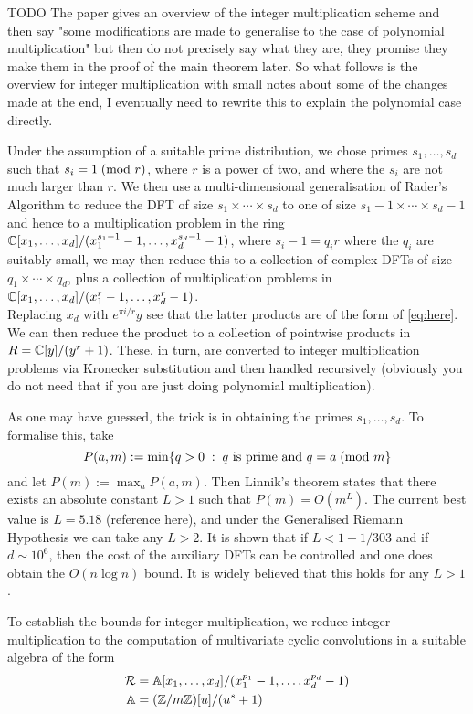 TODO The paper gives an overview of the integer multiplication scheme and then say "some modifications are made to generalise to the case of polynomial multiplication" but then do not precisely say what they are, they promise they make them in the proof of the main theorem later. So what follows is the overview for integer multiplication with small notes about some of the changes made at the end, I eventually need to rewrite this to explain the polynomial case directly.
\medskip

Under the assumption of a suitable prime distribution, we chose primes $s_1, \ldots, s_d$ such that $s_i = 1 \;(\textrm{mod } r)$, where $r$ is a power of two, and where the $s_i$ are not much larger than $r$. We then use a multi-dimensional generalisation of Rader's Algorithm to reduce the DFT of size $s_1 \times \cdots \times s_d$ to one of size $s_1-1 \times \cdots \times s_d-1$ and hence to a multiplication problem in the ring ${\mathbb C}[x_1, \ldots, x_d] / (x_1^{s_1 - 1} - 1, \ldots, x_d^{s_d - 1} - 1)$, where $s_i - 1 = q_i r$ where the $q_i$ are suitably small, we may then reduce this to a collection of complex DFTs of size $q_1 \times \cdots \times q_d$, plus a collection of multiplication problems in ${\mathbb C}[x_1, \ldots, x_d] / (x_1^r - 1, \ldots, x_d^r - 1)$. \\
Replacing $x_d$ with $e^{\pi i / r}y$ see that the latter products are of the form of \ref{eq:here}.  We can then reduce the product to a collection of pointwise products in $R = {\mathbb C}[y] / (y^r + 1)$. These, in turn, are converted to integer multiplication problems via Kronecker substitution and then handled recursively (obviously you do not need that if you are just doing polynomial multiplication).

As one may have guessed, the trick is in obtaining the primes $s_1, \ldots, s_d$. To formalise this, take
\[
    P(a, m) := \min\{q > 0\;:\; q \textrm{ is prime and } q = a \;(\textrm{mod } m\}
\]
and let $P(m) := \max_a P(a, m)$. Then Linnik's theorem states that there exists an absolute constant $L > 1$ such that $P(m) = O(m^L)$. The current best value is $L = 5.18$ (reference here), and under the Generalised Riemann Hypothesis we can take any $L > 2$. It is shown \cite{ffnlogn} that if $L < 1 + 1/303$ and if $d \sim 10^6$, then the cost of the auxiliary DFTs can be controlled and one does obtain the $O(n \log n)$ bound. It is widely believed that this holds for any $L > 1$.

To establish the bounds for integer multiplication, we reduce integer multiplication to the computation of multivariate cyclic convolutions in a suitable algebra of the form
\begin{align*}
    \mathcal R &= \mathbb{A}[x_1, \ldots, x_d] / (x_1^{p_1} - 1, \ldots, x_d^{p_d} - 1)\\
    \mathbb{A} &= ({\mathbb Z} / m{\mathbb Z})[u] / (u^s + 1)
\end{align*}

